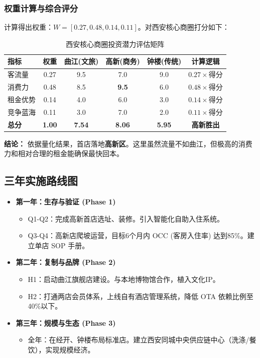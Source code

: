 \documentclass{cumcmthesis}
\begin{document}
\subsubsection{权重计算与综合评分}
计算得出权重：$W=[0.27, 0.48, 0.14, 0.11]$。对西安核心商圈打分如下：

\begin{table}[H]
    \centering
    \caption{西安核心商圈投资潜力评估矩阵}
    \begin{tabular}{l c c c c c}
        \toprule
        \textbf{指标} & \textbf{权重} & \textbf{曲江(文旅)} & \textbf{高新(商务)} & \textbf{钟楼(传统)} & \textbf{计算逻辑} \\
        \midrule
        客流量 & 0.27 & 9.5 & 7.0 & 9.0 & $0.27 \times \text{得分}$ \\
        消费力 & 0.48 & 8.5 & \textbf{9.5} & 6.0 & $0.48 \times \text{得分}$ \\
        租金优势 & 0.14 & 4.0 & 6.0 & 3.0 & $0.14 \times \text{得分}$ \\
        竞争蓝海 & 0.11 & 3.0 & 7.0 & 2.0 & $0.11 \times \text{得分}$ \\
        \midrule
        \textbf{总分} & \textbf{1.00} & \textbf{7.54} & \textbf{8.06} & \textbf{5.95} & \textbf{高新胜出} \\
        \bottomrule
    \end{tabular}
\end{table}

\textbf{结论：} 依据量化结果，首店落地\textbf{高新区}。这里虽然流量不如曲江，但极高的消费力和相对合理的租金能确保最快回本。

\subsection{三年实施路线图}
\begin{itemize}
    \item \textbf{第一年：生存与验证 (Phase 1)}
    \begin{itemize}
        \item Q1-Q2：完成高新首店选址、装修。引入智能化自助入住系统。
        \item Q3-Q4：高新店爬坡运营，目标6个月内 OCC (客房入住率) 达到85\%。建立单店 SOP 手册。
    \end{itemize}
    \item \textbf{第二年：复制与品牌 (Phase 2)}
    \begin{itemize}
        \item H1：启动曲江旗舰店建设。与本地博物馆合作，植入文化IP。
        \item H2：打通两店会员体系，上线自有酒店管理系统，降低 OTA 依赖比例至40\%以下。
    \end{itemize}
    \item \textbf{第三年：规模与生态 (Phase 3)}
    \begin{itemize}
        \item 全年：在经开、钟楼布局标准店。建立西安同城中央供应链中心（洗涤/餐饮），实现规模经济。
    \end{itemize}
\end{itemize}
\end{document}
